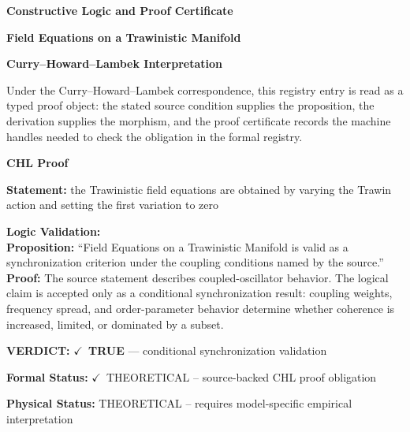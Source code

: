 \clearpage
\begingroup\tzpsupportsetup
\noindent\textbf{\fontsize{10.8pt}{12.8pt}\selectfont [ID 0034] Constructive Logic and Proof Certificate}\par
\noindent\textbf{\fontsize{10pt}{12pt}\selectfont Field Equations on a Trawinistic Manifold}\par
\vspace{0.45em}
\begingroup
\footnotesize
\setlength{\parskip}{0.22em}
\setlength{\parindent}{0pt}
\noindent\textbf{Curry--Howard--Lambek Interpretation}\par
Under the Curry--Howard--Lambek correspondence, this registry entry is read as a typed proof
object: the stated source condition supplies the proposition, the derivation supplies the
morphism, and the proof certificate records the machine handles needed to check the obligation
in the formal registry.

\vspace{0.45em}
\noindent\textbf{CHL Proof}\par
\textbf{Statement:} the Trawinistic field equations are obtained by varying the Trawin action and setting
the first variation to zero

\textbf{Logic Validation:}\\
\textbf{Proposition:} ``Field Equations on a Trawinistic Manifold is valid as a synchronization criterion under
the coupling conditions named by the source.''\\
\textbf{Proof:} The source statement describes coupled-oscillator behavior. The logical claim is
accepted only as a conditional synchronization result: coupling weights, frequency
spread, and order-parameter behavior determine whether coherence is increased, limited,
or dominated by a subset.

\textbf{VERDICT:} \ensuremath{\checkmark}\ \textbf{TRUE} --- conditional synchronization validation

\textbf{Formal Status:} \ensuremath{\checkmark}\ THEORETICAL -- source-backed CHL proof obligation

\textbf{Physical Status:} THEORETICAL -- requires model-specific empirical interpretation
\par\vspace{0.45em}
\par
\ifTZPDarkEdition
{}
\fi
\endgroup
\endgroup
